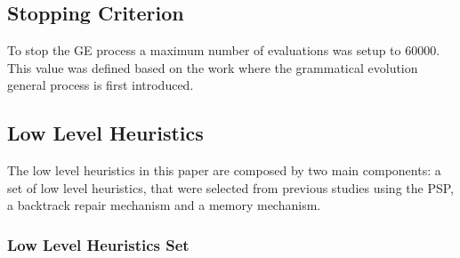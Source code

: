 \documentclass[conference]{IEEEtran}
\begin{document}
\subsection{Stopping Criterion}
\label{sub:criterioParada}

To stop the GE process a maximum number of evaluations was setup to 60000. This value was defined based on the work  \cite{ryan1998grammatical} where the grammatical evolution general process is first introduced.

  
  \subsection{Low Level Heuristics} 
  
  The low level heuristics in this paper are composed by two main components: a set of low level heuristics, that were selected from previous studies using the PSP, a backtrack repair mechanism and a memory mechanism.

  \subsubsection{Low Level Heuristics Set}
 
\end{document}

